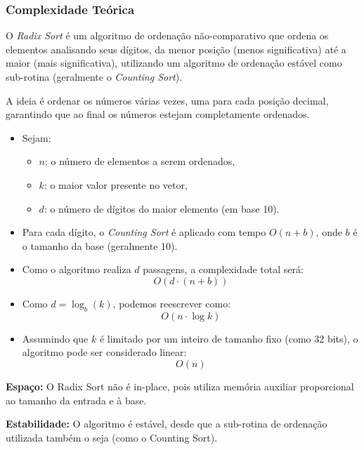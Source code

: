 \subsubsection{Complexidade Teórica}

O \textit{Radix Sort} é um algoritmo de ordenação não-comparativo que ordena os elementos analisando seus dígitos, da menor posição (menos significativa) até a maior (mais significativa), utilizando um algoritmo de ordenação estável como sub-rotina (geralmente o \textit{Counting Sort}).

A ideia é ordenar os números várias vezes, uma para cada posição decimal, garantindo que ao final os números estejam
completamente ordenados.~\cite{geeksforgeeks_radix_sort}

\begin{itemize}
    \item Sejam:
    \begin{itemize}
        \item \(n\): o número de elementos a serem ordenados,
        \item \(k\): o maior valor presente no vetor,
        \item \(d\): o número de dígitos do maior elemento (em base 10).
    \end{itemize}
    
    \item Para cada dígito, o \textit{Counting Sort} é aplicado com tempo \(O(n + b)\), onde \(b\) é o tamanho da base (geralmente 10).
    
    \item Como o algoritmo realiza \(d\) passagens, a complexidade total será:
    \[
    O(d \cdot (n + b))
    \]

    \item Como \(d = \log_b(k)\), podemos reescrever como:
    \[
    O(n \cdot \log k)
    \]

    \item Assumindo que \(k\) é limitado por um inteiro de tamanho fixo (como 32 bits), o algoritmo pode ser considerado linear:
    \[
    O(n)
    \]
\end{itemize}

\textbf{Espaço:} O Radix Sort não é in-place, pois utiliza memória auxiliar proporcional ao tamanho da entrada e à base.

\textbf{Estabilidade:} O algoritmo é estável, desde que a sub-rotina de ordenação utilizada também o seja (como o Counting Sort).

